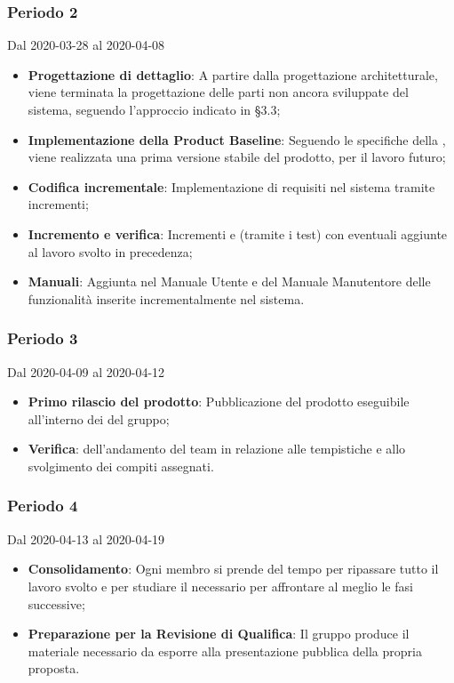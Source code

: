 \subsubsection{Periodo 2} 
Dal 2020-03-28 al 2020-04-08\\
\begin{itemize}
	\item \textbf{Progettazione di dettaglio}: A partire dalla progettazione architetturale, viene terminata la progettazione delle parti non ancora sviluppate del sistema, seguendo l'approccio indicato in §3.3;
	\item \textbf{Implementazione della Product Baseline}: Seguendo le specifiche della , viene realizzata una prima versione stabile del prodotto,  per il lavoro futuro;
	\item \textbf{Codifica incrementale}: Implementazione di requisiti nel sistema tramite incrementi;
	\item \textbf{Incremento e verifica}: Incrementi e  (tramite i test) con eventuali aggiunte al lavoro svolto in precedenza;
	\item \textbf{Manuali}: Aggiunta nel Manuale Utente e del Manuale Manutentore delle funzionalità inserite incrementalmente nel sistema.
\end{itemize}
\subsubsection{Periodo 3}
Dal 2020-04-09 al 2020-04-12\\
\begin{itemize}
	\item \textbf{Primo rilascio del prodotto}: Pubblicazione del prodotto eseguibile all'interno dei  del gruppo;
	\item \textbf{Verifica}:  dell'andamento del team in relazione alle tempistiche e allo svolgimento dei compiti assegnati.
\end{itemize}
\subsubsection{Periodo 4} 
Dal 2020-04-13 al 2020-04-19\\
\begin{itemize}
	\item \textbf{Consolidamento}: Ogni membro si prende del tempo per ripassare tutto il lavoro svolto e per studiare il necessario per affrontare al meglio le fasi successive;
	\item \textbf{Preparazione per la Revisione di Qualifica}: Il gruppo produce il materiale necessario da esporre alla presentazione pubblica della propria proposta.
\end{itemize}

